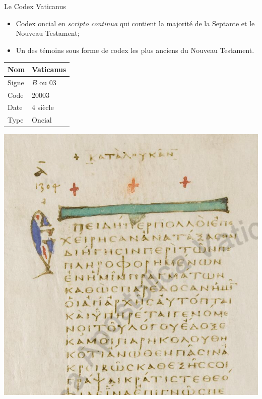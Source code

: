 \documentclass[11pt]{beamer}
\begin{document}
\begin{frame}{Le Codex Vaticanus}
    \begin{block}{}
    \begin{itemize}
        \item Codex oncial en \textit{scripto continua} qui contient la majorité de la Septante et le Nouveau Testament;
        \item Un des témoins sous forme de codex les plus anciens du Nouveau Testament.
    \end{itemize}
\end{block}


\begin{minipage}{.45\textwidth}
\begin{tabular}{l|l}
     Nom & Vaticanus \\
     \hline
     Signe & $B$ ou 03 \\
     \hline
     Code & 20003\\
     \hline
     Date & 4\ieme{} siècle \\
     \hline
     Type & Oncial \\
\end{tabular}
\end{minipage}
\hfill
\begin{minipage}{.45\textwidth}
    \includegraphics[scale=.2]{img/vaticanus_luke_inscriptio.png}
\end{minipage}
\end{frame}
\end{document}
